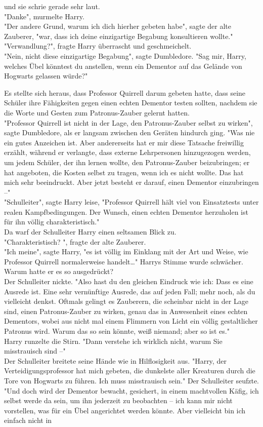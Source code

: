 {und sie schrie gerade sehr laut.\\ "Danke", murmelte Harry.\\ "Der andere Grund, warum ich dich hierher gebeten habe", sagte der alte Zauberer, "war, dass ich deine einzigartige Begabung konsultieren wollte."\\ "Verwandlung?", fragte Harry überrascht und geschmeichelt.\\ "Nein, nicht diese einzigartige Begabung", sagte Dumbledore. "Sag mir, Harry, welches Übel könntest du anstellen, wenn ein Dementor auf das Gelände von Hogwarts gelassen würde?"

Es stellte sich heraus, dass Professor Quirrell darum gebeten hatte, dass seine Schüler ihre Fähigkeiten gegen einen echten Dementor testen sollten, nachdem sie die Worte und Gesten zum Patronus-Zauber gelernt hatten.\\ "Professor Quirrell ist nicht in der Lage, den Patronus-Zauber selbst zu wirken", sagte Dumbledore, als er langsam zwischen den Geräten hindurch ging. "Was nie ein gutes Anzeichen ist. Aber andererseits hat er mir diese Tatsache freiwillig erzählt, während er verlangte, dass externe Lehrpersonen hinzugezogen werden, um jedem Schüler, der ihn lernen wollte, den Patronus-Zauber beizubringen; er hat angeboten, die Kosten selbst zu tragen, wenn ich es nicht wollte. Das hat mich sehr beeindruckt. Aber jetzt besteht er darauf, einen Dementor einzubringen --"\\ "Schulleiter", sagte Harry leise, "Professor Quirrell hält viel von Einsatztests unter realen Kampfbedingungen. Der Wunsch, einen echten Dementor herzuholen ist für ihn völlig charakteristisch."\\ Da warf der Schulleiter Harry einen seltsamen Blick zu.\\ "Charakteristisch? ", fragte der alte Zauberer.\\ "Ich meine", sagte Harry, "es ist völlig im Einklang mit der Art und Weise, wie Professor Quirrell normalerweise handelt…" Harrys Stimme wurde schwächer. Warum hatte er es so ausgedrückt?\\ Der Schulleiter nickte. "Also hast du den gleichen Eindruck wie ich: Dass es eine Ausrede ist. Eine sehr vernünftige Ausrede, das auf jeden Fall; mehr noch, als du vielleicht denkst. Oftmals gelingt es Zauberern, die scheinbar nicht in der Lage sind, einen Patronus-Zauber zu wirken, genau das in Anwesenheit eines echten Dementors, wobei aus nicht mal einem Flimmern von Licht ein völlig gestaltlicher Patronus wird. Warum das so sein könnte, weiß niemand; aber so ist es."\\ Harry runzelte die Stirn. "Dann verstehe ich wirklich nicht, warum Sie misstrauisch sind --"\\ Der Schulleiter breitete seine Hände wie in Hilflosigkeit aus. "Harry, der Verteidigungsprofessor hat mich gebeten, die dunkelste aller Kreaturen durch die Tore von Hogwarts zu führen. Ich muss misstrauisch sein." Der Schulleiter seufzte. "Und doch wird der Dementor bewacht, gesichert, in einem machtvollen Käfig, ich selbst werde da sein, um ihn jederzeit zu beobachten -- ich kann mir nicht vorstellen, was für ein Übel angerichtet werden könnte. Aber vielleicht bin ich einfach nicht in }
